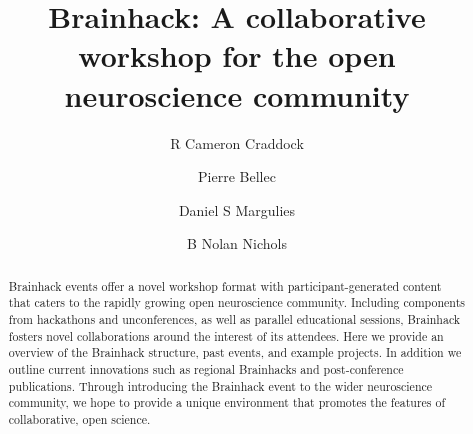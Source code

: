 \documentclass[11pt]{bmc_article_s50}
\begin{document}

\title{Brainhack: A collaborative workshop for the open neuroscience community}
\maketitle

\author[1,2*]{R Cameron Craddock}\cor{}
\author[3]{Pierre Bellec}
\author[4]{Daniel S Margulies}
\author[4]{B Nolan Nichols}

\address[1]{
  Computational Neuroimaging Lab, Center for Biomedical Imaging and \\\hspace*{59pt}Neuromodulation, Nathan S. Kline Institute for Psychiatric Research, \\\hspace*{59pt}140 Old Orangeburg Rd, 10962, Orangeburg, New York, USA
}
\address[2]{
  Center for the Developing Brain, Child Mind Institute, 445 Park Ave,\\\hspace*{59pt} 10022, New York, New York, USA
}
\address[3]{Centre de recherche de l’institut de g\'{e}riatrie de   Montr\'{e}al, Montr\'{e}al, QC, Canada
}
\address[4]{
  Max Planck Research Group for Neuroanatomy \& Connectivity,\\\hspace*{59pt} Max Planck Institute for Human Cognitive and Brain Sciences, \\\hspace*{59pt} Stephanstraße 1A, 04103, Leipzig, Germany
}
\address[5]{
  SRI International, 333 Ravenswood Ave, 94025, Menlo Park,  California, USA
}
\address[6]{
  Department of Psychiatry and Behavioral Sciences, Stanford University,\\\hspace*{59pt} 
  1265 Welch Road, 94306, Stanford,  California, USA
}

\begin{abstract} %
Brainhack events offer a novel workshop format with participant-generated content that caters to the rapidly growing open neuroscience community. Including components from hackathons and unconferences, as well as parallel educational sessions, Brainhack fosters novel collaborations around the interest of its attendees. Here we provide an overview of the Brainhack structure, past events, and example projects. In addition we outline current innovations such as regional Brainhacks and post-conference publications. Through introducing the Brainhack event to the wider neuroscience community, we hope to provide a unique environment that promotes the features of collaborative, open science.

\end{abstract}
\end{document}
